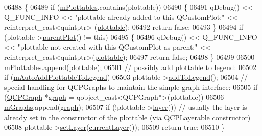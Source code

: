 \begin{DoxyCode}
06488 \{
06489   \textcolor{keywordflow}{if} (\hyperlink{a00116_a57ed6eb2e0a767a8344de45110a3e81d}{mPlottables}.contains(plottable))
06490   \{
06491     qDebug() << Q\_FUNC\_INFO << \textcolor{stringliteral}{"plottable already added to this QCustomPlot:"} << \textcolor{keyword}{reinterpret\_cast<}quintptr\textcolor{keyword}{>}
      (\hyperlink{a00116_a5c198d46ea2a2255a1b73e2c590f0364}{plottable});
06492     \textcolor{keywordflow}{return} \textcolor{keyword}{false};
06493   \}
06494   \textcolor{keywordflow}{if} (plottable->\hyperlink{a00044_ab7e0e94461566093d36ffc0f5312b109}{parentPlot}() != \textcolor{keyword}{this})
06495   \{
06496     qDebug() << Q\_FUNC\_INFO << \textcolor{stringliteral}{"plottable not created with this QCustomPlot as parent:"} << \textcolor{keyword}{
      reinterpret\_cast<}quintptr\textcolor{keyword}{>}(\hyperlink{a00116_a5c198d46ea2a2255a1b73e2c590f0364}{plottable});
06497     \textcolor{keywordflow}{return} \textcolor{keyword}{false};
06498   \}
06499   
06500   \hyperlink{a00116_a57ed6eb2e0a767a8344de45110a3e81d}{mPlottables}.append(plottable);
06501   \textcolor{comment}{// possibly add plottable to legend:}
06502   \textcolor{keywordflow}{if} (\hyperlink{a00116_ada47453c490f699c82bb400d749b2cf4}{mAutoAddPlottableToLegend})
06503     plottable->\hyperlink{a00024_a70f8cabfd808f7d5204b9f18c45c13f5}{addToLegend}();
06504   \textcolor{comment}{// special handling for QCPGraphs to maintain the simple graph interface:}
06505   \textcolor{keywordflow}{if} (\hyperlink{a00031}{QCPGraph} *\hyperlink{a00116_ac6b19830ab0f0073ff3089cf7c9b3c2e}{graph} = qobject\_cast<QCPGraph*>(plottable))
06506     \hyperlink{a00116_a54ed2081d9366a6c2137bf9d9f7b8371}{mGraphs}.append(\hyperlink{a00116_ac6b19830ab0f0073ff3089cf7c9b3c2e}{graph});
06507   \textcolor{keywordflow}{if} (!plottable->\hyperlink{a00044_aea67e8c19145e70d68c286a36f6b8300}{layer}()) \textcolor{comment}{// usually the layer is already set in the constructor of the plottable
       (via QCPLayerable constructor)}
06508     plottable->\hyperlink{a00044_ab0d0da6d2de45a118886d2c8e16d5a54}{setLayer}(\hyperlink{a00116_af73057345656cbd1463454982d808b00}{currentLayer}());
06509   \textcolor{keywordflow}{return} \textcolor{keyword}{true};
06510 \}
\end{DoxyCode}


